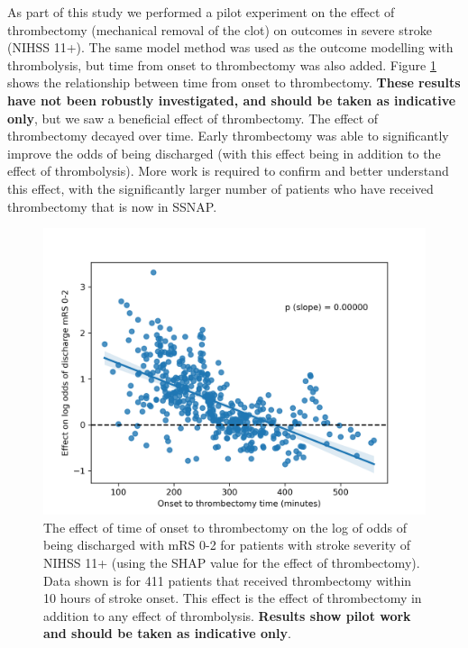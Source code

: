As part of this study we performed a pilot experiment on the effect of thrombectomy (mechanical removal of the clot) on outcomes in severe stroke (NIHSS 11+). The same model method was used as the outcome modelling with thrombolysis, but time from onset to thrombectomy was also added. Figure \ref{fig:thrombectomy} shows the relationship between time from onset to thrombectomy. \textbf{These results have not been robustly investigated, and should be taken as indicative only}, but we saw a beneficial effect of thrombectomy. The effect of thrombectomy decayed over time. Early thrombectomy was able to significantly improve the odds of being discharged (with this effect being in addition to the effect of thrombolysis). More work is required to confirm and better understand this effect, with the significantly larger number of patients who have received thrombectomy that is now in SSNAP.

\begin{figure}[!h]
    \centering
    \includegraphics[width=0.75\linewidth]{images/thrombectomy}
    \caption{The effect of time of onset to thrombectomy on the log of odds of being discharged with mRS 0-2 for patients with stroke severity of NIHSS 11+ (using the SHAP value for the effect of thrombectomy). Data shown is for 411 patients that received thrombectomy within 10 hours of stroke onset. This effect is the effect of thrombectomy in addition to any effect of thrombolysis. \textbf{Results show pilot work and should be taken as indicative only}.}
    \label{fig:thrombectomy}
\end{figure}




